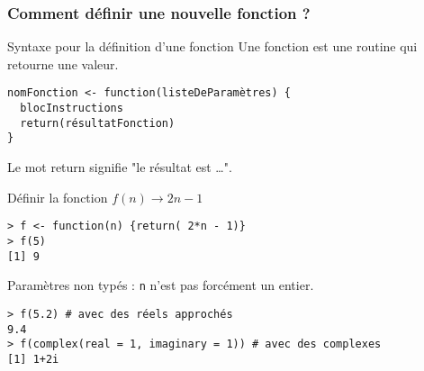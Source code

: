\documentclass[10pt]{beamer}
\begin{document}
\begin{frame}[fragile]
  \frametitle{Comment définir une nouvelle fonction ?}

  \begin{alertblock}{Syntaxe pour la définition d'une fonction}
    Une fonction est une routine qui retourne une valeur.
  \begin{lstlisting}[style=edblock]
nomFonction <- function(listeDeParamètres) {
  blocInstructions
  return(résultatFonction)
}
\end{lstlisting}
Le mot \alert{return} signifie "le résultat est \dots".
\end{alertblock}

\begin{exampleblock}{Définir la fonction $f(n) \rightarrow 2n - 1$}
  \begin{lstlisting}[style=block]
> f <- function(n) {return( 2*n - 1)}
> f(5)
[1] 9
\end{lstlisting}
\end{exampleblock}
\begin{block}{Paramètres non typés : \texttt{n} n'est pas forcément un entier.}
 \begin{lstlisting}[style=block]
> f(5.2) # avec des réels approchés
9.4
> f(complex(real = 1, imaginary = 1)) # avec des complexes
[1] 1+2i
  \end{lstlisting}
\end{block}
\end{frame}
\end{document}
